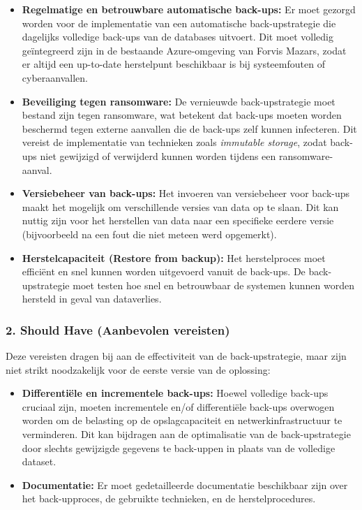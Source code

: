 \begin{itemize}
    \item \textbf{Regelmatige en betrouwbare automatische back-ups:} Er moet gezorgd worden voor de implementatie van een automatische back-upstrategie die dagelijks volledige back-ups van de databases uitvoert. Dit moet volledig geïntegreerd zijn in de bestaande Azure-omgeving van Forvis Mazars, zodat er altijd een up-to-date herstelpunt beschikbaar is bij systeemfouten of cyberaanvallen.
    
    \item \textbf{Beveiliging tegen ransomware:} De vernieuwde back-upstrategie moet bestand zijn tegen ransomware, wat betekent dat back-ups moeten worden beschermd tegen externe aanvallen die de back-ups zelf kunnen infecteren. Dit vereist de implementatie van technieken zoals \textit{immutable storage}, zodat back-ups niet gewijzigd of verwijderd kunnen worden tijdens een ransomware-aanval.
    
    \item \textbf{Versiebeheer van back-ups:} Het invoeren van versiebeheer voor back-ups maakt het mogelijk om verschillende versies van data op te slaan. Dit kan nuttig zijn voor het herstellen van data naar een specifieke eerdere versie (bijvoorbeeld na een fout die niet meteen werd opgemerkt).
    
    \item \textbf{Herstelcapaciteit (Restore from backup):} Het herstelproces moet efficiënt en snel kunnen worden uitgevoerd vanuit de back-ups. De back-upstrategie moet testen hoe snel en betrouwbaar de systemen kunnen worden hersteld in geval van dataverlies.
\end{itemize}

\subsubsection{2. Should Have (Aanbevolen vereisten)}
Deze vereisten dragen bij aan de effectiviteit van de back-upstrategie, maar zijn niet strikt noodzakelijk voor de eerste versie van de oplossing:

\begin{itemize}
    \item \textbf{Differentiële en incrementele back-ups:} Hoewel volledige back-ups cruciaal zijn, moeten incrementele en/of differentiële back-ups overwogen worden om de belasting op de opslagcapaciteit en netwerkinfrastructuur te verminderen. Dit kan bijdragen aan de optimalisatie van de back-upstrategie door slechts gewijzigde gegevens te back-uppen in plaats van de volledige dataset.
    
    \item \textbf{Documentatie:} Er moet gedetailleerde documentatie beschikbaar zijn over het back-upproces, de gebruikte technieken, en de herstelprocedures.
    
\end{itemize}

